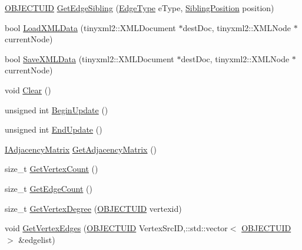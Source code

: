 \begin{DoxyCompactItemize}
\item 
\hyperlink{namespace_n_m_1_1_o_d_b_a262b64fab56baaa96e18bac4ada88265}{O\+B\+J\+E\+C\+T\+U\+I\+D} \hyperlink{class_n_m_1_1_o_d_b_1_1_c_object_database_a133d5a5d74bacdeba535fa55a2bd45ff}{Get\+Edge\+Sibling} (\hyperlink{namespace_n_m_1_1_o_d_b_a1ac3948936d4d0ab4367d35aa46068da}{Edge\+Type} e\+Type, \hyperlink{namespace_n_m_1_1_o_d_b_a1b474aa7e937112cda42381969dcb55e}{Sibling\+Position} position)
\item 
bool \hyperlink{class_n_m_1_1_o_d_b_1_1_c_object_database_a513e5758995acc1122abe83b1af6a9cf}{Load\+X\+M\+L\+Data} (tinyxml2\+::\+X\+M\+L\+Document $\ast$dest\+Doc, tinyxml2\+::\+X\+M\+L\+Node $\ast$current\+Node)
\item 
bool \hyperlink{class_n_m_1_1_o_d_b_1_1_c_object_database_a596806ff34088c667d0a161c4ddae14b}{Save\+X\+M\+L\+Data} (tinyxml2\+::\+X\+M\+L\+Document $\ast$dest\+Doc, tinyxml2\+::\+X\+M\+L\+Node $\ast$current\+Node)
\item 
void \hyperlink{class_n_m_1_1_o_d_b_1_1_c_object_database_afc48afb9b5beaa4797e0ab8d18b23f8b}{Clear} ()
\item 
unsigned int \hyperlink{class_n_m_1_1_o_d_b_1_1_c_object_database_ad0aaec454e7e12357f935b410503e60a}{Begin\+Update} ()
\item 
unsigned int \hyperlink{class_n_m_1_1_o_d_b_1_1_c_object_database_abbe4d83bfe24587f8bb2106d714dc2bc}{End\+Update} ()
\item 
\hyperlink{class_n_m_1_1_o_d_b_1_1_i_adjacency_matrix}{I\+Adjacency\+Matrix} \hyperlink{class_n_m_1_1_o_d_b_1_1_c_object_database_a5070b38870a434bac91e9b0445be7667}{Get\+Adjacency\+Matrix} ()
\item 
size\+\_\+t \hyperlink{class_n_m_1_1_o_d_b_1_1_c_object_database_ab7d8f69610a340eef06f979773ca2452}{Get\+Vertex\+Count} ()
\item 
size\+\_\+t \hyperlink{class_n_m_1_1_o_d_b_1_1_c_object_database_adaaa910be8b729b5fc6d23131c5e9dbd}{Get\+Edge\+Count} ()
\item 
size\+\_\+t \hyperlink{class_n_m_1_1_o_d_b_1_1_c_object_database_a02e7243f308498936443a6e34bece14e}{Get\+Vertex\+Degree} (\hyperlink{namespace_n_m_1_1_o_d_b_a262b64fab56baaa96e18bac4ada88265}{O\+B\+J\+E\+C\+T\+U\+I\+D} vertexid)
\item 
void \hyperlink{class_n_m_1_1_o_d_b_1_1_c_object_database_a68464ceb9042208a7e0213caae4ec565}{Get\+Vertex\+Edges} (\hyperlink{namespace_n_m_1_1_o_d_b_a262b64fab56baaa96e18bac4ada88265}{O\+B\+J\+E\+C\+T\+U\+I\+D} Vertex\+Src\+I\+D,\+::std\+::vector$<$ \hyperlink{namespace_n_m_1_1_o_d_b_a262b64fab56baaa96e18bac4ada88265}{O\+B\+J\+E\+C\+T\+U\+I\+D} $>$ \&edgelist)

\end{DoxyCompactItemize}

